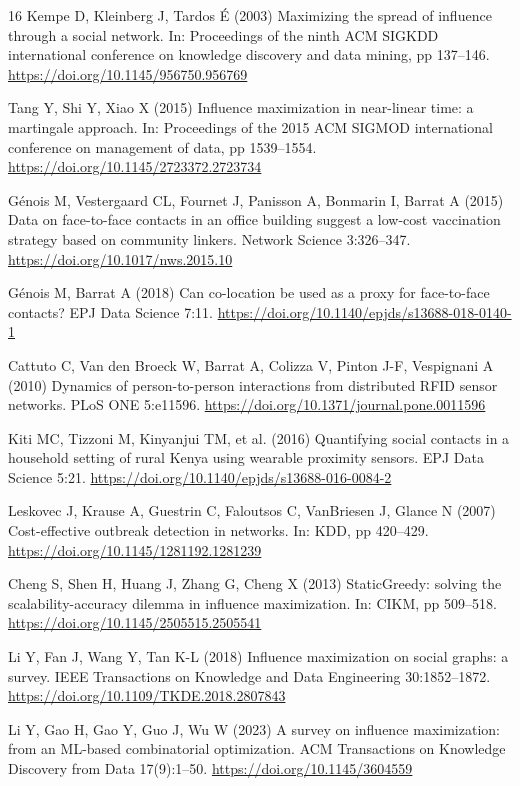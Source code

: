 \documentclass[smallextended]{svjour3}
\begin{document}
\begin{thebibliography}{16}
 Kempe D, Kleinberg J, Tardos É (2003) Maximizing the spread of influence through a social network. In: Proceedings of the ninth ACM SIGKDD international conference on knowledge discovery and data mining, pp 137--146. \url{https://doi.org/10.1145/956750.956769}

 Tang Y, Shi Y, Xiao X (2015) Influence maximization in near-linear time: a martingale approach. In: Proceedings of the 2015 ACM SIGMOD international conference on management of data, pp 1539--1554. \url{https://doi.org/10.1145/2723372.2723734}

 Génois M, Vestergaard CL, Fournet J, Panisson A, Bonmarin I, Barrat A (2015) Data on face-to-face contacts in an office building suggest a low-cost vaccination strategy based on community linkers. Network Science 3:326--347. \url{https://doi.org/10.1017/nws.2015.10}

 Génois M, Barrat A (2018) Can co-location be used as a proxy for face-to-face contacts? EPJ Data Science 7:11. \url{https://doi.org/10.1140/epjds/s13688-018-0140-1}

 Cattuto C, Van den Broeck W, Barrat A, Colizza V, Pinton J-F, Vespignani A (2010) Dynamics of person-to-person interactions from distributed RFID sensor networks. PLoS ONE 5:e11596. \url{https://doi.org/10.1371/journal.pone.0011596}

 Kiti MC, Tizzoni M, Kinyanjui TM, et al. (2016) Quantifying social contacts in a household setting of rural Kenya using wearable proximity sensors. EPJ Data Science 5:21. \url{https://doi.org/10.1140/epjds/s13688-016-0084-2}

 Leskovec J, Krause A, Guestrin C, Faloutsos C, VanBriesen J, Glance N (2007) Cost-effective outbreak detection in networks. In: KDD, pp 420--429. \url{https://doi.org/10.1145/1281192.1281239}

 Cheng S, Shen H, Huang J, Zhang G, Cheng X (2013) StaticGreedy: solving the scalability-accuracy dilemma in influence maximization. In: CIKM, pp 509--518. \url{https://doi.org/10.1145/2505515.2505541}

 Li Y, Fan J, Wang Y, Tan K-L (2018) Influence maximization on social graphs: a survey. IEEE Transactions on Knowledge and Data Engineering 30:1852--1872. \url{https://doi.org/10.1109/TKDE.2018.2807843}

 Li Y, Gao H, Gao Y, Guo J, Wu W (2023) A survey on influence maximization: from an ML-based combinatorial optimization. ACM Transactions on Knowledge Discovery from Data 17(9):1--50. \url{https://doi.org/10.1145/3604559}


\end{thebibliography}
\end{document}
